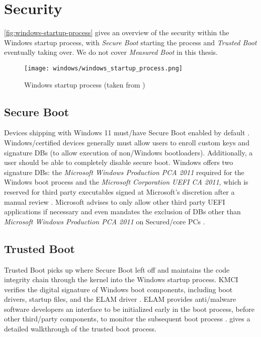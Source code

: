 
\section{Security}
\vspace{-0.5em}

\autoref{fig:windows-startup-process} gives an overview of the security within the Windows startup process, with \emph{Secure Boot} starting the process and \emph{Trusted Boot} eventually taking over.
We do not cover \emph{Measured Boot} in this thesis.

\begin{figure}[phtb]
    \centering
    \texttt{[image: windows/windows\_startup\_process.png]}
    \caption[Windows startup process]{Windows startup process (taken from \cite{microsoft-secure-the-windows-boot-process})}
    \label{fig:windows-startup-process}
\end{figure}

\vspace{-0.5em}
\subsection{Secure Boot}
\vspace{-0.5em}
Devices shipping with Windows 11 must\-/have Secure Boot enabled by default \cite{microsoft-windows-minimum-hardware-requirements-overview}.
Windows\-/certified devices generally must allow users to enroll custom keys and signature \acp{DB} (to allow execution of non\-/Windows bootloaders).
Additionally, a user should be able to completely disable secure boot.
Windows offers two signature \acp{DB}: the \emph{Microsoft Windows Production PCA 2011} required for the Windows boot process and the \emph{Microsoft Corporation \ac{UEFI} \ac{CA} 2011}, which is reserved for third party executables signed at Microsoft's discretion after a manual review \cite{microsoft-uefi-signing}.
Microsoft advises to only allow other third party \ac{UEFI} applications if necessary and even mandates the exclusion of \acp{DB} other than \emph{Microsoft Windows Production PCA 2011} on Secured\-/core \acp{PC} \cite{microsoft-secure-the-windows-boot-process}.

\subsection{Trusted Boot}
\vspace{-0.5em}
Trusted Boot picks up where Secure Boot left off and maintains the code integrity chain through the kernel into the Windows startup process.
\ac{KMCI} verifies the digital signature of Windows boot components, including boot drivers, startup files, and the \ac{ELAM} driver \cite{microsoft-trusted-boot}.
\ac{ELAM} provides anti\-/malware software developers an interface to be initialized early in the boot process, before other third\-/party components, to monitor the subsequent boot process \cite{micosoft-windows-elam}.
\cite{understanding-windows-trusted-boot} gives a detailed walkthrough of the trusted boot process.

